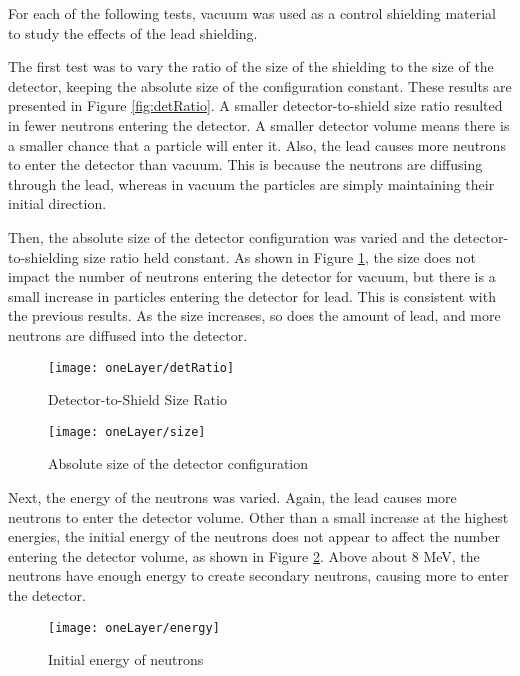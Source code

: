 \documentclass[12pt]{article}
\begin{document}
For each of the following tests, vacuum was used as a control shielding material to study the effects of the lead shielding.

The first test was to vary the ratio of the size of the shielding to the size of the detector, keeping the absolute size of the configuration constant. These results are presented in Figure \ref{fig:detRatio}. A smaller detector-to-shield size ratio resulted in fewer neutrons entering the detector. A smaller detector volume means there is a smaller chance  that a particle will enter it. Also, the lead causes more neutrons to enter the detector than vacuum. This is because the neutrons are diffusing through the lead, whereas in vacuum the particles are simply maintaining their initial direction. 

Then, the absolute size of the detector configuration was varied and the detector-to-shielding size ratio held constant. As shown in Figure \ref{fig:size}, the size does not impact the number of neutrons entering the detector for vacuum, but there is a small increase in particles entering the detector for lead. This is consistent with the previous results. As the size increases, so does the amount of lead, and more neutrons are diffused into the detector.

\begin{figure}[H]
  \centering
  \begin{minipage}[t]{0.45\linewidth}
    \texttt{[image: oneLayer/detRatio]}
    \caption{Detector-to-Shield Size Ratio}
    \label{fig:detRatio}
  \end{minipage}
  \quad
  \begin{minipage}[t]{0.45\linewidth}
    \texttt{[image: oneLayer/size]}
    \caption{Absolute size of the detector configuration}
    \label{fig:size}
  \end{minipage}
\end{figure}

Next, the energy of the neutrons was varied. Again, the lead causes more neutrons to enter the detector volume. Other than a small increase at the highest energies, the initial energy of the neutrons does not appear to affect the number entering the detector volume, as shown in Figure \ref{fig:energy}. Above about 8 MeV, the neutrons have enough energy to create secondary neutrons, causing more to enter the detector.

\begin{figure}[H]
 \centering
 \texttt{[image: oneLayer/energy]}
 \caption{Initial energy of neutrons}
 \label{fig:energy}
\end{figure}
\end{document}
